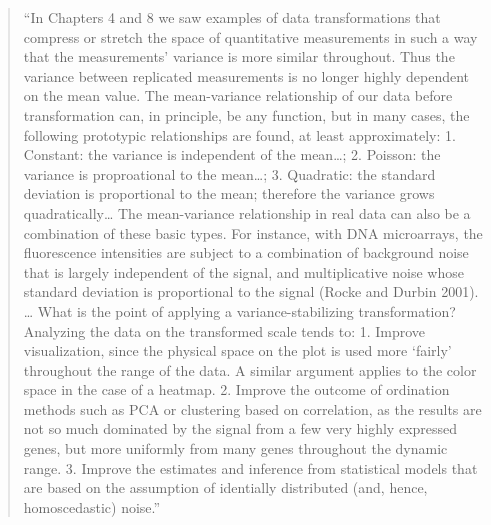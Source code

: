 \documentclass[]{tufte-book}
\begin{document}
\begin{quote}
``In Chapters 4 and 8 we saw examples of data transformations that compress or
stretch the space of quantitative measurements in such a way that the
measurements' variance is more similar throughout. Thus the variance between
replicated measurements is no longer highly dependent on the mean value. The
mean-variance relationship of our data before transformation can, in
principle, be any function, but in many cases, the following prototypic relationships
are found, at least approximately: 1. Constant: the variance is independent
of the mean\ldots; 2. Poisson: the variance is proproational to the mean\ldots;
3. Quadratic: the standard deviation is proportional to the mean; therefore
the variance grows quadratically\ldots{} The mean-variance relationship in real data
can also be a combination of these basic types. For instance, with DNA microarrays,
the fluorescence intensities are subject to a combination of background noise that
is largely independent of the signal, and multiplicative noise whose standard
deviation is proportional to the signal (Rocke and Durbin 2001). \ldots{}
What is the point of applying a variance-stabilizing transformation? Analyzing the
data on the transformed scale tends to: 1. Improve visualization, since the
physical space on the plot is used more `fairly' throughout the range of the
data. A similar argument applies to the color space in the case of a heatmap.
2. Improve the outcome of ordination methods such as PCA or clustering based
on correlation, as the results are not so much dominated by the signal from a few
very highly expressed genes, but more uniformly from many genes throughout the
dynamic range. 3. Improve the estimates and inference from statistical models
that are based on the assumption of identially distributed (and, hence,
homoscedastic) noise.''
\citep{holmes2018modern}
\end{quote}
\end{document}
